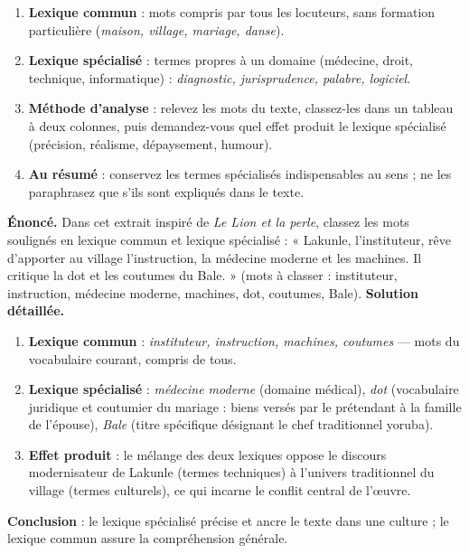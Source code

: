 \documentclass[11pt]{article}
\begin{document}
\begin{methode}
\begin{enumerate}
\item \textbf{Lexique commun} : mots compris par tous les locuteurs, sans formation particulière (\emph{maison, village, mariage, danse}).
\item \textbf{Lexique spécialisé} : termes propres à un domaine (médecine, droit, technique, informatique) : \emph{diagnostic, jurisprudence, palabre, logiciel}.
\item \textbf{Méthode d'analyse} : relevez les mots du texte, classez-les dans un tableau à deux colonnes, puis demandez-vous quel effet produit le lexique spécialisé (précision, réalisme, dépaysement, humour).
\item \textbf{Au résumé} : conservez les termes spécialisés indispensables au sens ; ne les paraphrasez que s'ils sont expliqués dans le texte.
\end{enumerate}
\end{methode}

\begin{exoresolu}
\textbf{Énoncé.} Dans cet extrait inspiré de \emph{Le Lion et la perle}, classez les mots soulignés en lexique commun et lexique spécialisé : « Lakunle, l'instituteur, rêve d'apporter au village l'instruction, la médecine moderne et les machines. Il critique la dot et les coutumes du Bale. » (mots à classer : instituteur, instruction, médecine moderne, machines, dot, coutumes, Bale).
\tcblower
\textbf{Solution détaillée.}
\begin{enumerate}
\item \textbf{Lexique commun} : \emph{instituteur, instruction, machines, coutumes} — mots du vocabulaire courant, compris de tous.
\item \textbf{Lexique spécialisé} : \emph{médecine moderne} (domaine médical), \emph{dot} (vocabulaire juridique et coutumier du mariage : biens versés par le prétendant à la famille de l'épouse), \emph{Bale} (titre spécifique désignant le chef traditionnel yoruba).
\item \textbf{Effet produit} : le mélange des deux lexiques oppose le discours modernisateur de Lakunle (termes techniques) à l'univers traditionnel du village (termes culturels), ce qui incarne le conflit central de l'œuvre.
\end{enumerate}
\textbf{Conclusion} : le lexique spécialisé précise et ancre le texte dans une culture ; le lexique commun assure la compréhension générale.
\end{exoresolu}
\end{document}
